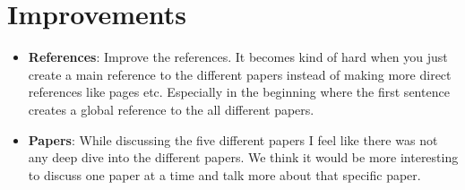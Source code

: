 \documentclass[12pt]{article}
\begin{document}
\section{Improvements}
\begin{itemize}
    \item \textbf{References}: Improve the references. It becomes kind of hard when you just create a main reference to the different papers instead of making more direct references like pages etc. Especially in the beginning where the first sentence creates a global reference to the all different papers.
\end{itemize}
\begin{itemize}
    \item \textbf{Papers}: While discussing the five different papers I feel like there was not any deep dive into the different papers. We think it would be more interesting to discuss one paper at a time and talk more about that specific paper.
\end{itemize}

\printbibliography
\end{document}
